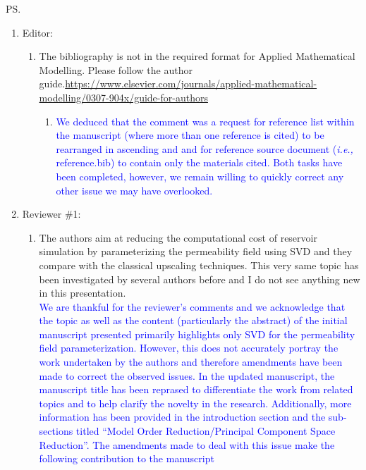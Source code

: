 \documentclass[11pt]{letter} %
\newcommand{\blue}{\textcolor{blue}}
\newcommand{\ie}{{\it i.e., }}
\begin{document}
\begin{letter}
\ps{
  \begin{enumerate}
  \item Editor:   
    \begin{enumerate}
    \item \label{R_E} The bibliography is not in the required format for Applied Mathematical Modelling. Please follow the author guide.\url{https://www.elsevier.com/journals/applied-mathematical-modelling/0307-904x/guide-for-authors}
      \begin{enumerate}
      \item \label{R_E_P1} \blue{We deduced that the comment was a request for reference list within the manuscript (where more than one reference is cited) to be rearranged in ascending and and for reference source document (\ie{reference.bib}) to contain only the materials cited. Both tasks have been completed, however, we remain willing to quickly correct any other issue we may have overlooked.}
        \end{enumerate}
      \end{enumerate}    
  \item Reviewer \#1: 
    \begin{enumerate}
    \item \label{R_R1_Novelty} The authors aim at reducing the computational cost of reservoir simulation by parameterizing the permeability field using SVD and they compare with the classical upscaling techniques. This very same topic has been investigated by several authors before and I do not see anything new in this presentation.\\
      \blue {We are thankful for the reviewer's comments and we acknowledge that the topic as well as the content (particularly the abstract) of the initial manuscript presented  primarily highlights only SVD for the permeability field parameterization. However, this does not accurately portray the work undertaken by the authors and therefore amendments have been made to correct the observed issues. In the updated manuscript, the manuscript title has been reprased to differentiate the work from related topics and to help clarify the novelty in the research. Additionally, more information has been provided in the introduction section and the sub-sections titled ``Model Order Reduction/Principal Component Space Reduction''. The amendments made to deal with this issue make the following contribution to the manuscript}
      \begin{enumerate}

\end{enumerate}
\end{enumerate}
\end{enumerate}}
\end{letter}
\end{document}
